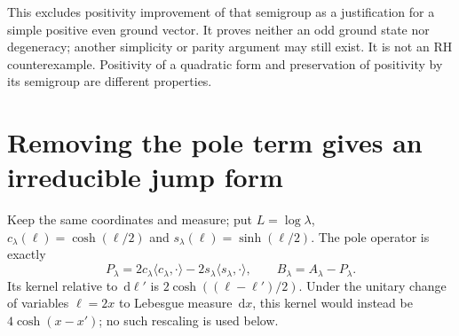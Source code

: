 \documentclass[11pt]{article}
\theoremstyle{remark}\newtheorem{remark}[theorem]{Remark}
\newcommand{\dd}{\,\mathrm d}
\begin{document}
This excludes positivity improvement of that semigroup
as a justification for a simple positive even ground vector.
It proves neither an odd ground state nor degeneracy;
another simplicity or parity argument may still exist.
It is not an RH counterexample. Positivity of a quadratic
form and preservation of positivity by its semigroup are
different properties.

\section{Removing the pole term gives an irreducible jump form}
Keep the same coordinates and measure; put $L=\log\lambda$,
$c_\lambda(\ell)=\cosh(\ell/2)$ and
$s_\lambda(\ell)=\sinh(\ell/2)$. The pole operator is exactly
\[
 P_\lambda=2c_\lambda\langle c_\lambda,\cdot\rangle
              -2s_\lambda\langle s_\lambda,\cdot\rangle,
 \qquad B_\lambda=A_\lambda-P_\lambda.
\]
Its kernel relative to $\dd\ell'$ is
$2\cosh((\ell-\ell')/2)$. Under the unitary change of
variables $\ell=2x$ to Lebesgue measure $\dd x$, this kernel
would instead be $4\cosh(x-x')$; no such rescaling is used below.
\end{document}

